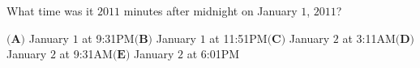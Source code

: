 What time was it $2011$ minutes after midnight on January $1$, $2011$?

$\textbf{(A)}$ January $1$ at 9:31PM\qquad $\textbf{(B)}$ January $1$ at 11:51PM\qquad $\textbf{(C)}$ January $2$ at 3:11AM\qquad $\textbf{(D)}$ January $2$ at 9:31AM\qquad $\textbf{(E)}$ January $2$ at 6:01PM
